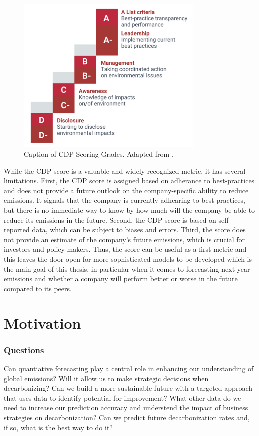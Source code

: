\begin{figure}[h]
    \centering
    \includegraphics[width=0.8\textwidth]{figures/cdp_scoring.png}
    \caption{Caption of CDP Scoring Grades. Adapted from \cite{CDP2022ScoringPDF}.}
    \label{fig:my_label}
\end{figure}


\noindent While the CDP score is a valuable and widely recognized metric, it has several limitations. First, the CDP score is assigned based on adherance to best-practices and does not provide a future outlook on the company-specific ability to reduce emissions. It signals that the company is currently adhearing to best practices, but there is no immediate way to know by how much will the company be able to reduce its emissions in the future. Second, the CDP score is based on self-reported data, which can be subject to biases and errors. Third, the score does not provide an estimate of the company's future emissions, which is crucial for investors and policy makers. Thus, the score can be useful as a first metric and this leaves the door open for more sophisticated models to be developed which is the main goal of this thesis, in particular when it comes to forecasting next-year emissions and whether a company will perform better or worse in the future compared to its peers.


\section{Motivation}
\subsubsection{Questions}
 Can quantiative forecasting play a central role in enhancing our understanding of global emissions? Will it allow us to make strategic decisions when decarbonizing? Can we build a more sustainable future with a targeted approach that uses data to identify potential for improvement? What other data do we need to increase our prediction accuracy and understend the impact of business strategies on decarbonization? Can we predict future decarbonization rates and, if so, what is the best way to do it? \\ 
